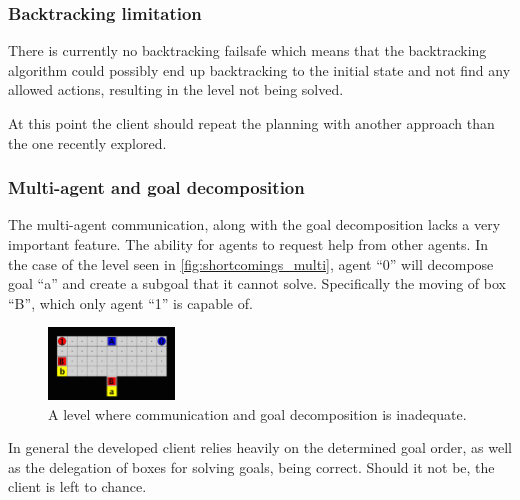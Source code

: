 \documentclass[Main]{subfiles}
\begin{document}
\subsubsection{Backtracking limitation}
There is currently no backtracking failsafe which means that the backtracking
algorithm could possibly end up backtracking to the initial state and not find
any allowed actions, resulting in the level not being solved. 

At this point the client should repeat the planning with another approach than
the one recently explored. 

\subsubsection{Multi-agent and goal decomposition}
The multi-agent communication, along with the goal decomposition lacks a very
important feature. The ability for agents to request help from other agents. In
the case of the level seen in \autoref{fig:shortcomings_multi}, agent ``0'' will
decompose goal ``a'' and create a subgoal that it cannot solve. Specifically the
moving of box ``B'', which only agent ``1'' is capable of. 

\begin{figure}[h!]
  \centering
  \includegraphics[width=0.3\textwidth]{shortcomings_multi.png}
  \caption{A level where communication and goal decomposition is inadequate.}
  \label{fig:shortcomings_multi}
\end{figure}

In general the developed client relies heavily on the determined goal
order, as well as the delegation of boxes for solving goals, being correct.
Should it not be, the client is left to chance. 
\end{document}
